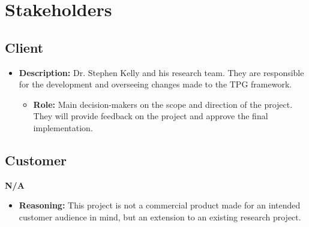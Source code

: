 \documentclass[12pt]{article}
\newcommand{\lips}{\textit{Insert your content here.}}
\begin{document}
\section{Stakeholders}
\subsection{Client}
\begin{itemize}
  \item \textbf{Description:} Dr. Stephen Kelly and his research team. They are responsible for the development and overseeing changes made to the TPG framework.
    \begin{itemize}
      \item \textbf{Role:} Main decision-makers on the scope and direction of the project. They will provide feedback on the project and approve the final implementation.
    \end{itemize}

  \end{itemize}





\subsection{Customer}
\textbf{N/A}
\begin{itemize}
\item \textbf{Reasoning:} This project is not a commercial product made for an intended customer audience in mind, but an extension to an existing research project.
\end{itemize}
\end{document}
